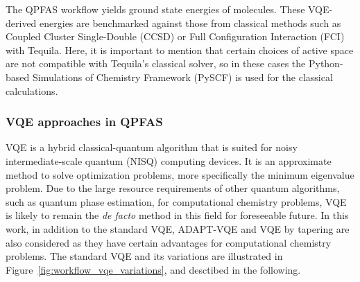\documentclass[journal,onecolumn]{IEEEtran}
\begin{document}
The QPFAS workflow yields ground state energies of molecules. 
These VQE-derived energies are benchmarked against those from classical methods such as Coupled Cluster Single-Double (CCSD) or Full Configuration Interaction (FCI) with Tequila. 
Here, it is important to mention that certain choices of active space are not compatible with Tequila's classical solver, so in these cases the Python-based Simulations of Chemistry Framework (PySCF) \cite{sun2018pyscf} is used for the classical calculations.

\subsubsection{VQE approaches in QPFAS}
\label{sec:vqe_approaches}
 VQE \cite{peruzzo2014variational} is a hybrid classical-quantum algorithm that is suited for noisy intermediate-scale quantum (NISQ) computing devices.
It is an approximate method to solve optimization problems, more specifically the minimum eigenvalue problem. 
Due to the large resource requirements of other quantum algorithms, such as quantum phase estimation,\cite{Goings2022-xb} for computational chemistry problems, VQE is likely to remain the \textit{de facto} method in this field for foreseeable future. 
%
 In this work, in addition to the standard VQE, ADAPT-VQE and VQE by tapering are also considered as they have certain advantages for computational chemistry problems.
 The standard VQE and its variations are illustrated in Figure~\ref{fig:workflow_vqe_variations}, and desctibed in the following.
\end{document}

